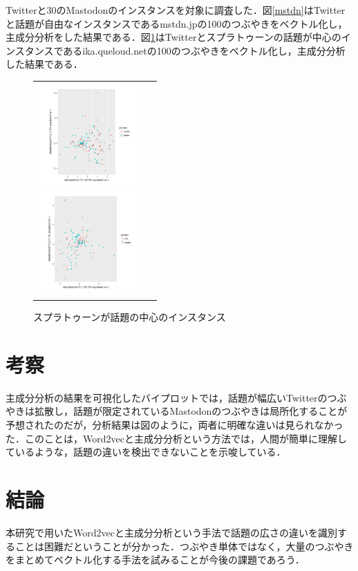 \documentclass[uplatex,twocolumn,dvipdfmx]{jsarticle}
\begin{document}
Twitterと30のMastodonのインスタンスを対象に調査した．図\ref{mstdn}はTwitterと話題が自由なインスタンスであるmstdn.jpの100のつぶやきをベクトル化し，主成分分析をした結果である．図\ref{ika}はTwitterとスプラトゥーンの話題が中心のインスタンスであるika.queloud.netの100のつぶやきをベクトル化し，主成分分析した結果である．
\vspace{-1.0zh}
\begin{figure}[h]
\begin{tabular}{cc}
\begin{minipage}{0.5\hsize}
\begin{center}
\includegraphics[width=40mm,clip]{mstdn.pdf}
\caption{話題が自由なインスタンス}
\label{mstdn}
\end{center}
\end{minipage}
\begin{minipage}{0.5\hsize}
\begin{center}
\includegraphics[width=40mm,clip]{ika.pdf}
\caption{スプラトゥーンが話題の中心のインスタンス}
\label{ika}
\end{center} 
\end{minipage}
\end{tabular}
\end{figure}
\vspace{-1.0zh}
\section{考察}

主成分分析の結果を可視化したバイプロットでは，話題が幅広いTwitterのつぶやきは拡散し，話題が限定されているMastodonのつぶやきは局所化することが予想されたのだが，分析結果は図のように，両者に明確な違いは見られなかった．このことは，Word2vecと主成分分析という方法では，人間が簡単に理解しているような，話題の違いを検出できないことを示唆している．

\section{結論}

本研究で用いたWord2vecと主成分分析という手法で話題の広さの違いを識別することは困難だということが分かった．つぶやき単体ではなく，大量のつぶやきをまとめてベクトル化する手法を試みることが今後の課題であろう．



\end{document}
